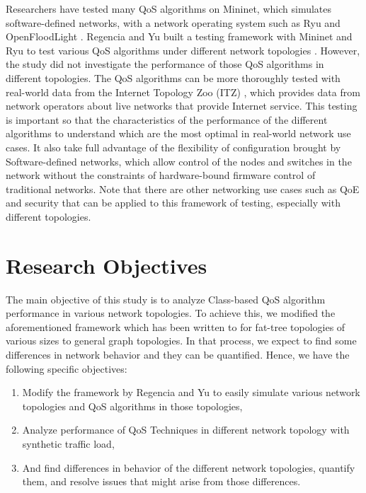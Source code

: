 Researchers have tested many QoS algorithms on Mininet, which simulates software-defined networks, with a network operating system such as Ryu and OpenFloodLight \cite{karakus_quality_2017}. Regencia and Yu built a testing framework with Mininet and Ryu to test various QoS algorithms under different network topologies \cite{yang_introducing_2022}. However, the study did not investigate the performance of those QoS algorithms in different topologies. The QoS algorithms can be more thoroughly tested with real-world data from the Internet Topology Zoo (ITZ) \cite{knight_internet_2011}, which provides data from network operators about live networks that provide Internet service. This testing is important so that the characteristics of the performance of the different algorithms to understand which are the most optimal in real-world network use cases. It also take full advantage of the flexibility of configuration brought by Software-defined networks, which allow control of the nodes and switches in the network without the constraints of hardware-bound firmware control of traditional networks. Note that there are other networking use cases such as QoE and security that can be applied to this framework of testing, especially with different topologies.

\section{Research Objectives}
The main objective of this study is to analyze Class-based QoS algorithm performance in various network topologies. To achieve this, we modified the aforementioned framework which has been written to for fat-tree topologies of various sizes to general graph topologies. In that process, we expect to find some differences in network behavior and they can be quantified. Hence, we have the following specific objectives:

\begin{enumerate}
    \item Modify the framework by Regencia and Yu to easily simulate various network topologies and QoS algorithms in those topologies,
    \item Analyze performance of QoS Techniques in different network topology with synthetic traffic load,
    \item And find differences in behavior of the different network topologies, quantify them, and resolve issues that might arise from those differences.
\end{enumerate}


